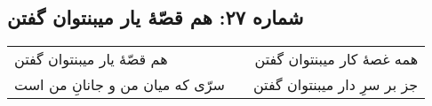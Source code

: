 \begin{center}
\section*{شماره ۲۷: هم قصّۀ یار میبنتوان گفتن}
\label{sec:027}
\begin{longtable}{l p{0.5cm} r}
هم قصّهٔ یار میبنتوان گفتن
&&
همه غصهٔ کار میبنتوان گفتن
\\
سرّی که میان من و جانانِ من است
&&
جز بر سرِ دار میبنتوان گفتن
\\
\end{longtable}
\end{center}
